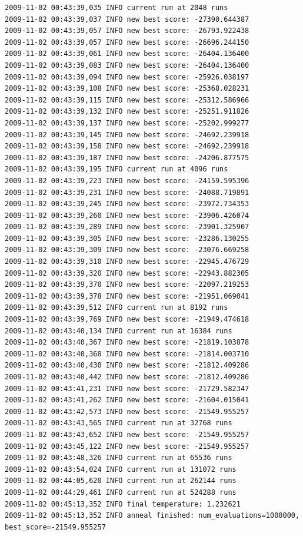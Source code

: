 \documentclass[12pt]{article}
\begin{document}
\begin{verbatim}
2009-11-02 00:43:39,035 INFO current run at 2048 runs
2009-11-02 00:43:39,037 INFO new best score: -27390.644387
2009-11-02 00:43:39,057 INFO new best score: -26793.922438
2009-11-02 00:43:39,057 INFO new best score: -26696.244150
2009-11-02 00:43:39,061 INFO new best score: -26404.136400
2009-11-02 00:43:39,083 INFO new best score: -26404.136400
2009-11-02 00:43:39,094 INFO new best score: -25926.038197
2009-11-02 00:43:39,108 INFO new best score: -25368.028231
2009-11-02 00:43:39,115 INFO new best score: -25312.586966
2009-11-02 00:43:39,132 INFO new best score: -25251.911826
2009-11-02 00:43:39,137 INFO new best score: -25202.999277
2009-11-02 00:43:39,145 INFO new best score: -24692.239918
2009-11-02 00:43:39,158 INFO new best score: -24692.239918
2009-11-02 00:43:39,187 INFO new best score: -24206.877575
2009-11-02 00:43:39,195 INFO current run at 4096 runs
2009-11-02 00:43:39,223 INFO new best score: -24159.595396
2009-11-02 00:43:39,231 INFO new best score: -24088.719891
2009-11-02 00:43:39,245 INFO new best score: -23972.734353
2009-11-02 00:43:39,260 INFO new best score: -23906.426074
2009-11-02 00:43:39,289 INFO new best score: -23901.325907
2009-11-02 00:43:39,305 INFO new best score: -23286.130255
2009-11-02 00:43:39,309 INFO new best score: -23076.669258
2009-11-02 00:43:39,310 INFO new best score: -22945.476729
2009-11-02 00:43:39,320 INFO new best score: -22943.882305
2009-11-02 00:43:39,370 INFO new best score: -22097.219253
2009-11-02 00:43:39,378 INFO new best score: -21951.069041
2009-11-02 00:43:39,512 INFO current run at 8192 runs
2009-11-02 00:43:39,769 INFO new best score: -21949.474618
2009-11-02 00:43:40,134 INFO current run at 16384 runs
2009-11-02 00:43:40,367 INFO new best score: -21819.103878
2009-11-02 00:43:40,368 INFO new best score: -21814.003710
2009-11-02 00:43:40,430 INFO new best score: -21812.409286
2009-11-02 00:43:40,442 INFO new best score: -21812.409286
2009-11-02 00:43:41,231 INFO new best score: -21729.582347
2009-11-02 00:43:41,262 INFO new best score: -21604.015041
2009-11-02 00:43:42,573 INFO new best score: -21549.955257
2009-11-02 00:43:43,565 INFO current run at 32768 runs
2009-11-02 00:43:43,652 INFO new best score: -21549.955257
2009-11-02 00:43:45,122 INFO new best score: -21549.955257
2009-11-02 00:43:48,326 INFO current run at 65536 runs
2009-11-02 00:43:54,024 INFO current run at 131072 runs
2009-11-02 00:44:05,620 INFO current run at 262144 runs
2009-11-02 00:44:29,461 INFO current run at 524288 runs
2009-11-02 00:45:13,352 INFO final temperature: 1.232621
2009-11-02 00:45:13,352 INFO anneal finished: num_evaluations=1000000, best_score=-21549.955257

\end{verbatim}
\end{document}
